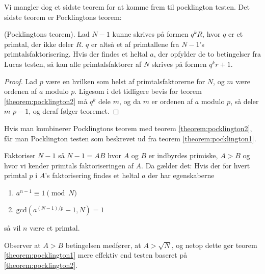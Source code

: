 Vi mangler dog et sidste teorem for at komme frem til pocklington testen. Det sidste teorem er Pocklingtons teorem:
\begin{theorem}
\label{theorem:pocklingtons-theorem}
(Pocklingtons teorem). Lad $N-1$ kunne skrives på formen $q^kR$, hvor $q$ er et primtal, der ikke deler $R$.
$q$ er altså et af primtallene fra $N-1$'s primtalsfaktorisering. Hvis der findes et heltal $a$,
der opfylder de to betingelser fra Lucas testen, så kan alle primtalsfaktorer af $N$ skrives på formen $q^kr+1$.
\end{theorem}
\begin{proof}
Lad $p$ være en hvilken som helst af primtalsfaktorerne for $N$, og $m$ være ordenen af 
$a$ modulo $p$. Ligesom i det tidligere bevis for teorem \ref{theorem:pocklington2} må $q^k$ dele $m$,
og da $m$ er ordenen af $a$ modulo $p$, så deler $m$ $p-1$, og deraf følger teoremet.
\end{proof}
Hvis man kombinerer Pocklingtons teorem med teorem \ref{theorem:pocklington2}, får man Pocklington testen som beskrevet ud fra teorem \ref{theorem:pocklington1}.
\begin{theorem}
\label{theorem:pocklington1}
Faktoriser $N-1$ så $N-1=AB$ hvor $A$ og $B$ er indbyrdes primiske, $A>B$ og hvor vi kender primtals faktoriseringen
af $A$. Da gælder det:
Hvis der for hvert primtal $p$ i $A$'s faktorisering findes et heltal $a$ der har egenskaberne
\begin{enumerate}
\item $a^{n-1}\equiv 1 \pmod{N}$
\item $\text{gcd}(a^{(N-1)/p}-1, N) = 1$
\end{enumerate}
så vil $n$ være et primtal.
\end{theorem}
Observer at $A>B$ betingelsen medfører, at $A>\sqrt{N}$, og netop dette gør teorem \ref{theorem:pocklington1}
mere effektiv end testen baseret på \ref{theorem:pocklington2}. 
